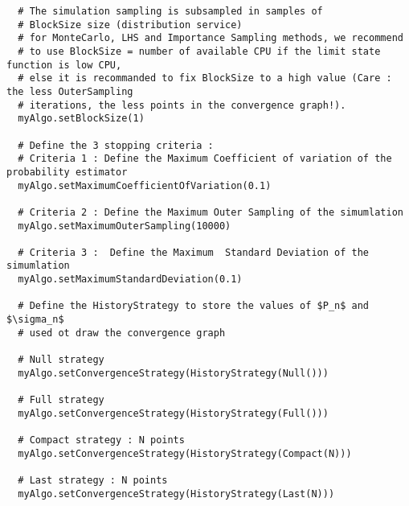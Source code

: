 \begin{lstlisting}
  # The simulation sampling is subsampled in samples of
  # BlockSize size (distribution service)
  # for MonteCarlo, LHS and Importance Sampling methods, we recommend
  # to use BlockSize = number of available CPU if the limit state function is low CPU,
  # else it is recommanded to fix BlockSize to a high value (Care : the less OuterSampling
  # iterations, the less points in the convergence graph!).
  myAlgo.setBlockSize(1)

  # Define the 3 stopping criteria :
  # Criteria 1 : Define the Maximum Coefficient of variation of the probability estimator
  myAlgo.setMaximumCoefficientOfVariation(0.1)

  # Criteria 2 : Define the Maximum Outer Sampling of the simumlation
  myAlgo.setMaximumOuterSampling(10000)

  # Criteria 3 :  Define the Maximum  Standard Deviation of the simumlation
  myAlgo.setMaximumStandardDeviation(0.1)

  # Define the HistoryStrategy to store the values of $P_n$ and $\sigma_n$
  # used ot draw the convergence graph

  # Null strategy
  myAlgo.setConvergenceStrategy(HistoryStrategy(Null()))

  # Full strategy
  myAlgo.setConvergenceStrategy(HistoryStrategy(Full()))

  # Compact strategy : N points
  myAlgo.setConvergenceStrategy(HistoryStrategy(Compact(N)))

  # Last strategy : N points
  myAlgo.setConvergenceStrategy(HistoryStrategy(Last(N)))
\end{lstlisting}

